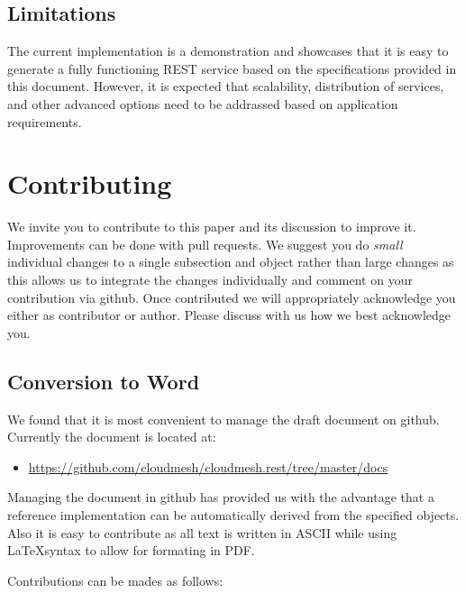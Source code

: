 \documentclass[10pt]{article}
\begin{document}
\subsection{Limitations}

The current implementation is a demonstration and showcases that it is
easy to generate a fully functioning REST service based on the
specifications provided in this document. However, it is expected that
scalability, distribution of services, and other advanced options
need to be addrassed based on application requirements.



\section{Contributing}

We invite you to contribute to this paper and its discussion to
improve it. Improvements can be done with pull requests. We suggest
you do {\em small} individual changes to a single subsection and
object rather than large changes as this allows us to integrate the
changes individually and comment on your contribution via github. Once
contributed we will appropriately acknowledge you either as
contributor or author. Please discuss with us how we best acknowledge
you.


\subsection{Conversion to Word}

We found that it is most convenient to manage the draft document on
github. Currently the document is located at:

\begin{itemize}
\item \url{https://github.com/cloudmesh/cloudmesh.rest/tree/master/docs}
\end{itemize}

Managing the document in github has provided us with the advantage that a
reference implementation can be automatically derived from the
specified objects. Also it is easy to contribute as all text is
written in ASCII while using \LaTeX syntax to allow for formating in
PDF. 

Contributions can be mades as follows:
\end{document}
